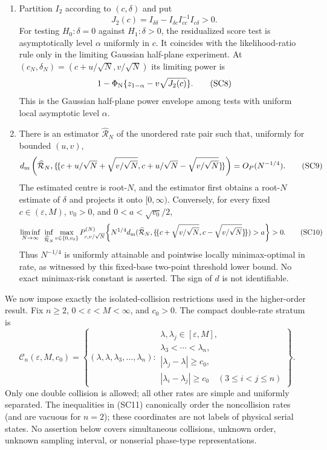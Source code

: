 \begin{paperthm}
\begin{enumerate}[label=\textup{(\roman*)},leftmargin=2.6em]
\item Partition \(I_2\) according to \((c,\delta)\) and put
\[
 J_2(c)=I_{\delta\delta}
 -I_{\delta c}I_{cc}^{-1}I_{c\delta}>0.
\tag{SC7}
\]
For testing \(H_0:\delta=0\) against \(H_1:\delta>0\), the residualized
score test is asymptotically level \(\alpha\) uniformly in \(c\).  It
coincides with the likelihood-ratio rule only in the limiting Gaussian
half-plane experiment.  At
\((c_N,\delta_N)=(c+u/\sqrt N,v/\sqrt N)\) its limiting power is
\[
 1-\Phi_{\rm N}\{z_{1-\alpha}-v\sqrt{J_2(c)}\}.
\tag{SC8}
\]
This is the Gaussian half-plane power envelope among tests with uniform local
asymptotic level \(\alpha\).

\item There is an estimator \(\widehat{\mathcal R}_N\) of the unordered rate
pair such that, uniformly for bounded \((u,v)\),
\[
 d_{\rm m}\left(
 \widehat{\mathcal R}_N,
 \{\!\{c+u/\sqrt N+\sqrt{v/\sqrt N},
          c+u/\sqrt N-\sqrt{v/\sqrt N}\}\!\}\right)
 =O_P(N^{-1/4}).
\tag{SC9}
\]
The estimated centre is root-\(N\), and the estimator first obtains a
root-\(N\) estimate of \(\delta\) and projects it onto \([0,\infty)\).
Conversely, for every fixed \(c\in(\varepsilon,M)\), \(v_0>0\), and
\(0<a<\sqrt{v_0}/2\),
\[
 \liminf_{N\to\infty}\ \inf_{\widehat{\mathcal R}_N}
 \max_{v\in\{0,v_0\}}
 P_{c,v/\sqrt N}^{(N)}\!\left\{
 N^{1/4}d_{\rm m}(\widehat{\mathcal R}_N,
 \{\!\{c+\sqrt{v/\sqrt N},c-\sqrt{v/\sqrt N}\}\!\})>a
 \right\}>0.
\tag{SC10}
\]
Thus \(N^{-1/4}\) is uniformly attainable and pointwise locally
minimax-optimal in rate, as witnessed by this fixed-base two-point threshold
lower bound.  No exact minimax-risk constant is asserted.  The sign of \(d\)
is not identifiable.
\end{enumerate}
\end{paperthm}

We now impose exactly the isolated-collision restrictions used in the
higher-order result.  Fix \(n\ge2\), \(0<\varepsilon<M<\infty\), and
\(c_0>0\).  The compact double-rate stratum is
\[
\mathcal C_{n}(\varepsilon,M,c_0)=
\left\{(\lambda,\lambda,\lambda_3,\ldots,\lambda_n):
\begin{array}{l}
\lambda,\lambda_j\in[\varepsilon,M],\\
\lambda_3<\cdots<\lambda_n,\\
|\lambda_j-\lambda|\ge c_0,\\
|\lambda_i-\lambda_j|\ge c_0\quad(3\le i<j\le n)
\end{array}\right\}.
\tag{SC11}
\]
Only one double collision is allowed; all other rates are simple and uniformly
separated.  The inequalities in \textup{(SC11)} canonically order the
noncollision rates (and are vacuous for \(n=2\)); these coordinates are not
labels of physical serial states.  No assertion below covers simultaneous
collisions, unknown order, unknown sampling interval, or nonserial phase-type
representations.

